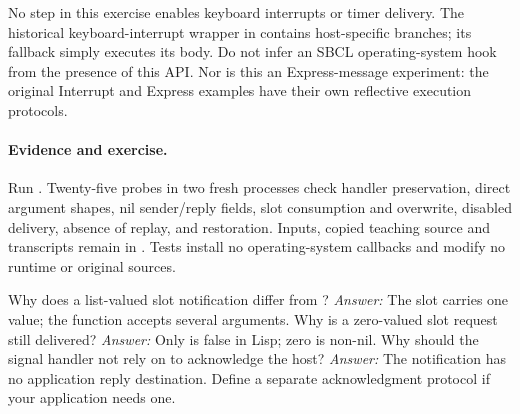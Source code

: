 No step in this exercise enables keyboard interrupts or timer delivery.
The historical keyboard-interrupt wrapper in 
contains host-specific branches; its fallback simply executes its body.
Do not infer an SBCL operating-system hook from the presence of this API.
Nor is this an Express-message experiment: the original Interrupt and
Express examples have their own reflective execution protocols.

\paragraph{Evidence and exercise.}
Run . Twenty-five probes in two
fresh processes check handler preservation, direct argument shapes,
nil sender/reply fields, slot consumption and overwrite, disabled delivery,
absence of replay, and restoration. Inputs, copied teaching source and
transcripts remain in . Tests install
no operating-system callbacks and modify no runtime or original sources.

Why does a list-valued slot notification differ from
? \emph{Answer:} The slot carries one
value; the function accepts several arguments. Why is a zero-valued
slot request still delivered? \emph{Answer:} Only  is false
in Lisp; zero is non-nil. Why should the signal handler not rely on
\code{!} to acknowledge the host? \emph{Answer:} The notification has
no application reply destination. Define a separate acknowledgment
protocol if your application needs one.
